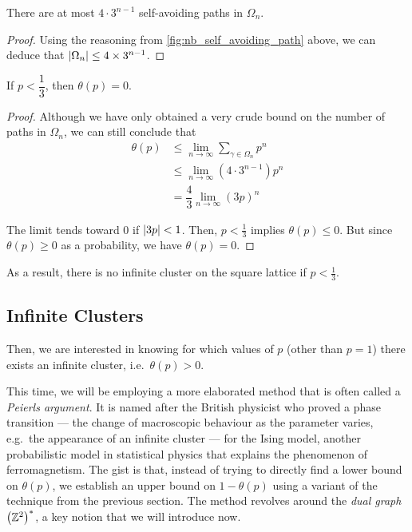 \documentclass[a4paper, 12pt]{article}
\begin{document}
\begin{prop}\label{prop:nb_paths_len_n}
There are at most $4 \cdot 3^{n - 1}$ self-avoiding paths in $\Omega_n$.
\end{prop}

\begin{proof}
Using the reasoning from \cref{fig:nb_self_avoiding_path} above, we can deduce that $\lvert \Omega_n \rvert \leq 4 \times 3^{n - 1}$.
\end{proof}

\begin{thm}\label{thm:pc_lower_bound}
If $p < \dfrac{1}{3}$, then $\theta(p) = 0$.
\end{thm}
\begin{proof}
Although we have only obtained a very crude bound on the number of paths in $\Omega_n$, we can still conclude that
\begin{align*}
    \theta(p)
    &\leq \lim_{n \to \infty} \sum_{\gamma \in \Omega_n} p^n\\
    &\leq \lim_{n \to \infty} \left(4 \cdot 3^{n - 1}\right) p^n\\
    &= \dfrac{4}{3} \lim_{n \to \infty} (3p)^n
\end{align*}

The limit tends toward 0 if $\lvert 3p \rvert < 1$. Then, $p < \frac{1}{3}$ implies $\theta(p) \leq 0$. But since $\theta(p) \geq 0$ as a probability, we have $\theta(p) = 0$.
\end{proof}

As a result, there is no infinite cluster on the square lattice if $p < \frac{1}{3}$.

\subsection{Infinite Clusters}\label{subsec:inf_cluster}
Then, we are interested in knowing for which values of $p$ (other than $p = 1$) there exists an infinite cluster, i.e.\ $\theta(p) > 0$.

This time, we will be employing a more elaborated method that is often called a \textit{Peierls argument}. It is named after the British physicist who proved a phase transition --- the change of macroscopic behaviour as the parameter varies, e.g.\ the appearance of an infinite cluster --- for the Ising model, another probabilistic model in statistical physics that explains the phenomenon of ferromagnetism. The gist is that, instead of trying to directly find a lower bound on $\theta(p)$, we establish an upper bound on $1 - \theta(p)$ using a variant of the technique from the previous section. The method revolves around the \textit{dual graph} $\left(\mathbb{Z}^2\right)^*$, a key notion that we will introduce now.
\end{document}

